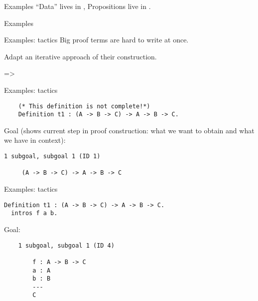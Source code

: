 \documentclass{beamer}
\begin{document}
\begin{frame}[fragile]{Examples}
    ``Data'' lives in , Propositions live in .

    
\end{frame}

\begin{frame}[fragile]{Examples}
    
\end{frame}

\begin{frame}[fragile]{Examples: tactics}
    Big proof terms are hard to write at once. 

    Adapt an iterative approach of their construction.

    
    
    =>
   
    

\end{frame}

\begin{frame}[fragile]{Examples: tactics}
    \begin{lstlisting}
    (* This definition is not complete!*)
    Definition t1 : (A -> B -> C) -> A -> B -> C. 
    \end{lstlisting}
    Goal (shows current step in proof construction: what we want to obtain and what we have in context):

    \begin{lstlisting}
1 subgoal, subgoal 1 (ID 1)

     (A -> B -> C) -> A -> B -> C

    \end{lstlisting}

\end{frame}

\begin{frame}[fragile]{Examples: tactics}
    \begin{lstlisting}
Definition t1 : (A -> B -> C) -> A -> B -> C.
  intros f a b.
  \end{lstlisting}
  Goal:

    \begin{lstlisting}
    1 subgoal, subgoal 1 (ID 4)

        f : A -> B -> C
        a : A
        b : B
        ---
        C
    \end{lstlisting}

\end{frame}
\end{document}
